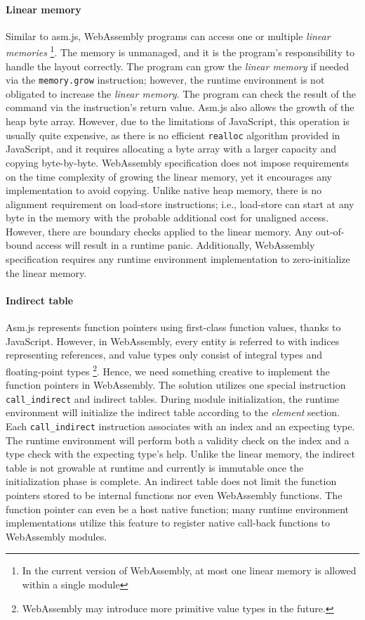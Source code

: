 \paragraph{Linear memory}
Similar to asm.js, WebAssembly programs can access one or multiple
\emph{linear memories} \footnote{In the current version of WebAssembly, at most
  one linear memory is allowed within a single module}. The memory is unmanaged,
and it is the program's responsibility to handle the layout correctly. The
program can grow the \emph{linear memory} if needed via the \texttt{memory.grow}
instruction; however, the runtime environment is not obligated to increase the
\emph{linear memory}. The program can check the result of the command via the
instruction's return value. Asm.js also allows the growth of the heap byte
array. However, due to the limitations of JavaScript, this operation is usually
quite expensive, as there is no efficient \texttt{realloc} algorithm provided in
JavaScript, and it requires allocating a byte array with a larger capacity and
copying byte-by-byte. WebAssembly specification does not impose requirements on
the time complexity of growing the linear memory, yet it encourages any
implementation to avoid copying.  Unlike native heap memory, there is no
alignment requirement on load-store instructions; i.e., load-store can start at
any byte in the memory with the probable additional cost for unaligned access.
However, there are boundary checks applied to the linear memory. Any
out-of-bound access will result in a runtime panic. Additionally, WebAssembly
specification requires any runtime environment implementation to
zero-initialize the linear memory.

\paragraph{Indirect table}
Asm.js represents function pointers using first-class function values, thanks to
JavaScript. However, in WebAssembly, every entity is referred to with indices
representing references, and value types only consist of integral types and
floating-point types \footnote{WebAssembly may introduce more primitive value
  types in the future.}. Hence, we need something creative to implement the
function pointers in WebAssembly. The solution utilizes one special instruction
\texttt{call\_indirect} and indirect tables. During module initialization, the
runtime environment will initialize the indirect table according to the
\emph{element} section. Each \texttt{call\_indirect} instruction associates
with an index and an expecting type. The runtime environment will perform both
a validity check on the index and a type check with the expecting type's help.
Unlike the linear memory, the indirect table is not growable at runtime and
currently is immutable once the initialization phase is complete. An indirect
table does not limit the function pointers stored to be internal functions nor
even WebAssembly functions. The function pointer can even be a host native
function; many runtime environment implementations utilize this feature to
register native call-back functions to WebAssembly modules.

